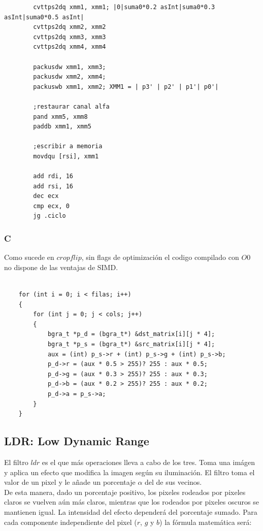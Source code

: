 \begin{codesnippet}
\begin{verbatim}
		cvttps2dq xmm1, xmm1; |0|suma0*0.2 asInt|suma0*0.3 asInt|suma0*0.5 asInt|
		cvttps2dq xmm2, xmm2
		cvttps2dq xmm3, xmm3
		cvttps2dq xmm4, xmm4

		packusdw xmm1, xmm3; 
		packusdw xmm2, xmm4;
		packuswb xmm1, xmm2; XMM1 = | p3' | p2' | p1'| p0'|

		;restaurar canal alfa
		pand xmm5, xmm8
		paddb xmm1, xmm5

		;escribir a memoria
		movdqu [rsi], xmm1

		add rdi, 16	
		add rsi, 16
		dec ecx
		cmp ecx, 0
		jg .ciclo
\end{verbatim}
\end{codesnippet}

\subsubsection{C}

Como sucede en $cropflip$, sin flags de optimización el codigo compilado con $O0$ no dispone de las ventajas de SIMD.

\begin{codesnippet}
\begin{verbatim}

    for (int i = 0; i < filas; i++)
    {
        for (int j = 0; j < cols; j++)
        {
            bgra_t *p_d = (bgra_t*) &dst_matrix[i][j * 4];
            bgra_t *p_s = (bgra_t*) &src_matrix[i][j * 4];
            aux = (int) p_s->r + (int) p_s->g + (int) p_s->b;
            p_d->r = (aux * 0.5 > 255)? 255 : aux * 0.5;
            p_d->g = (aux * 0.3 > 255)? 255 : aux * 0.3;
            p_d->b = (aux * 0.2 > 255)? 255 : aux * 0.2;
            p_d->a = p_s->a;
        }
    }

\end{verbatim}
\end{codesnippet}


\subsection{LDR: Low Dynamic Range}

El filtro $ldr$ es el que más operaciones lleva a cabo de los tres.
Toma una imágen y aplica un efecto que modifica la imagen según su iluminación. El filtro toma el valor de un pixel y le añade un porcentaje $\alpha$ del de sus vecinos.\\

De esta manera, dado un porcentaje positivo, los pixeles rodeados por pixeles claros se vuelven
aún más claros, mientras que los rodeados por pixeles oscuros se mantienen igual. La intensidad
del efecto dependerá del porcentaje sumado.
Para cada componente independiente del pixel ($r$, $g$ y $b$) la fórmula matemática será:

